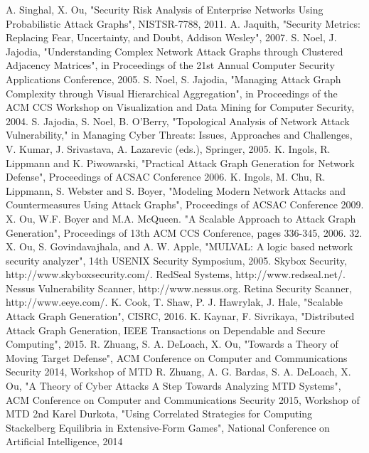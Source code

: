 \documentclass[12pt,a4paper]{article}
\begin{document}
\renewcommand{\refname}{\centerline{参考文献}}
\begin{thebibliography}{}
 A. Singhal, X. Ou, "Security Risk Analysis of Enterprise Networks Using Probabilistic Attack Graphs", NISTSR-7788, 2011.
 A. Jaquith, "Security Metrics: Replacing Fear, Uncertainty, and Doubt, Addison Wesley", 2007.
 S. Noel, J. Jajodia, "Understanding Complex Network Attack Graphs through Clustered Adjacency Matrices", in Proceedings of the 21st Annual Computer Security Applications Conference, 2005.
 S. Noel, S. Jajodia, "Managing Attack Graph Complexity through Visual Hierarchical Aggregation", in Proceedings of the ACM CCS Workshop on Visualization and Data Mining for Computer Security, 2004.
 S. Jajodia, S. Noel, B. O’Berry, "Topological Analysis of Network Attack Vulnerability," in Managing Cyber Threats: Issues, Approaches and Challenges, V. Kumar, J. Srivastava, A. Lazarevic (eds.), Springer, 2005.
 K. Ingols, R. Lippmann and K. Piwowarski, "Practical Attack Graph Generation for Network Defense", Proceedings of ACSAC Conference 2006.
 K. Ingols, M. Chu, R. Lippmann, S. Webster and S. Boyer, "Modeling Modern Network Attacks and Countermeasures Using Attack Graphs", Proceedings of ACSAC Conference 2009.
 X. Ou, W.F. Boyer and M.A. McQueen. "A Scalable Approach to Attack Graph Generation", Proceedings of 13th ACM CCS Conference, pages 336-345, 2006.
 32. X. Ou, S. Govindavajhala, and A. W. Apple, "MULVAL: A logic based network security analyzer", 14th USENIX Security Symposium, 2005.
 Skybox Security, http://www.skyboxsecurity.com/.
 RedSeal Systems, http://www.redseal.net/.
 Nessus Vulnerability Scanner, http://www.nessus.org.
 Retina Security Scanner, http://www.eeye.com/.
 K. Cook, T. Shaw, P. J. Hawrylak, J. Hale, "Scalable Attack Graph Generation", CISRC, 2016.
 K. Kaynar, F. Sivrikaya, "Distributed Attack Graph Generation, IEEE Transactions on Dependable and Secure Computing", 2015.
 R. Zhuang, S. A. DeLoach, X. Ou, "Towards a Theory of Moving Target Defense", ACM Conference on Computer and Communications Security 2014, Workshop of MTD
 R. Zhuang, A. G. Bardas, S. A. DeLoach, X. Ou, "A Theory of Cyber Attacks A Step Towards Analyzing MTD Systems", ACM Conference on Computer and Communications Security 2015, Workshop of MTD 2nd
 Karel Durkota, "Using Correlated Strategies for Computing Stackelberg Equilibria in Extensive-Form Games", National Conference on Artificial Intelligence, 2014

\end{thebibliography}
\end{document}
